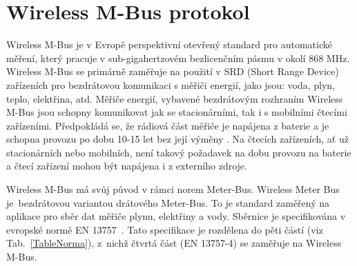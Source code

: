 \chapter{Wireless M-Bus protokol}
\label{ChapterWMBus}
Wireless M-Bus je v Evropě perspektivní otevřený standard pro automatické měření, který pracuje v sub-gigahertzovém bezlicenčním pásmu v okolí 868 MHz. Wireless M-Bus se primárně zaměřuje na použití v SRD (Short Range Device) zařízeních pro bezdrátovou komunikaci s měřiči energií, jako jsou: voda, plyn, teplo, elektřina, atd. Měřiče energií, vybavené bezdrátovým rozhraním Wireless M-Bus jsou schopny komunikovat jak se stacionárními, tak i s mobilními čtecími zařízeními. Předpokládá se, že rádiová část měřiče je napájena z baterie a je schopna provozu po dobu 10-15 let bez její výměny \cite{CidloWeptech,CidloBonega}. Na čtecích zařízeních, ať už stacionárních nebo mobilních, není takový požadavek na dobu provozu na baterie a čtecí zařízení mohou být napájena i z externího zdroje.

Wireless M-Bus má svůj původ v rámci norem Meter-Bus. Wireless Meter Bus je~bezdrátovou variantou drátového Meter-Bus. To je standard zaměřený na aplikace pro sběr dat měřiče plynu, elektřiny a vody. Sběrnice je specifikována v evropské normě EN 13757~\cite{Norma1}. Tato specifikace je rozdělena do pěti částí (viz Tab.~\ref{TableNorma}), z~nichž čtvrtá část (EN 13757-4) se zaměřuje na Wireless M-Bus.

